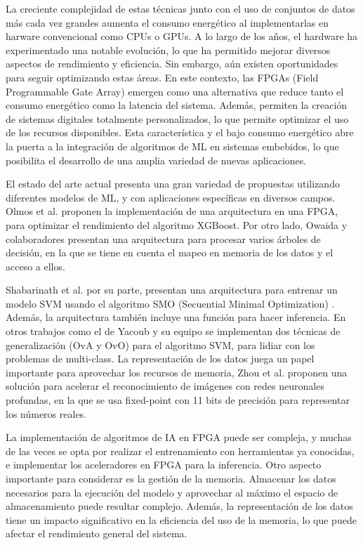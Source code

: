\documentclass[conference, 10pt]{IEEEtran}
\begin{document}
La creciente complejidad de estas técnicas junto con el uso de conjuntos de datos más cada vez grandes aumenta el
consumo energético al implementarlas en harware convencional como CPUs o GPUs. A lo largo de los años, el
hardware ha experimentado una notable evolución, lo que ha permitido mejorar diversos aspectos de rendimiento
y eficiencia. Sin embargo, aún existen oportunidades para seguir optimizando estas áreas. En este contexto, las
FPGAs (Field Programmable Gate Array) emergen como una alternativa que reduce tanto el consumo energético
como la latencia del sistema. Además, permiten la creación de sistemas digitales totalmente personalizados, lo que
permite optimizar el uso de los recursos disponibles. Esta característica y el bajo consumo energético abre la puerta
a la integración de algoritmos de ML en sistemas embebidos, lo que posibilita el desarrollo de una amplia variedad
de nuevas aplicaciones.

El estado del arte actual presenta una gran variedad de propuestas utilizando diferentes modelos de ML, y con
aplicaciones específicas en diversos campos. Olmos et al. \cite{olmosoptimized} proponen la implementación de una arquitectura en
una FPGA, para optimizar el rendimiento del algoritmo XGBoost. Por otro lado, Owaida y colaboradores \cite{owaida2017scalable}
presentan una arquitectura para procesar varios árboles de decisión, en la que se tiene en cuenta el mapeo en
memoria de los datos y el acceso a ellos.

Shabarinath et al. \cite{10969767} por su parte, presentan una arquitectura para entrenar un modelo SVM usando el algoritmo
SMO (Secuential Minimal Optimization) \cite{10.5555/299094.299105}. Además, la arquitectura también incluye una función para hacer
inferencia. En otros trabajos como el de Yacoub y su equipo \cite{YACOUB2024100115} se implementan dos técnicas de generalización (OvA
y OvO) para el algoritmo SVM, para lidiar con los problemas de multi-class. La representación de los datos juega un
papel importante para aprovechar los recursos de memoria, Zhou et al. \cite{7490869} proponen una solución para acelerar el
reconocimiento de imágenes con redes neuronales profundas, en la que se usa fixed-point con 11 bits de precisión
para representar los números reales.

La implementación de algoritmos de IA en FPGA puede ser compleja, y muchas de las veces se opta por realizar el
entrenamiento con herramientas ya conocidas, e implementar los aceleradores en FPGA para la inferencia. Otro
aspecto importante para considerar es la gestión de la memoria. Almacenar los datos necesarios para la ejecución
del modelo y aprovechar al máximo el espacio de almacenamiento puede resultar complejo. Además, la
representación de los datos tiene un impacto significativo en la eficiencia del uso de la memoria, lo que puede afectar el rendimiento general del sistema.



\end{document}
